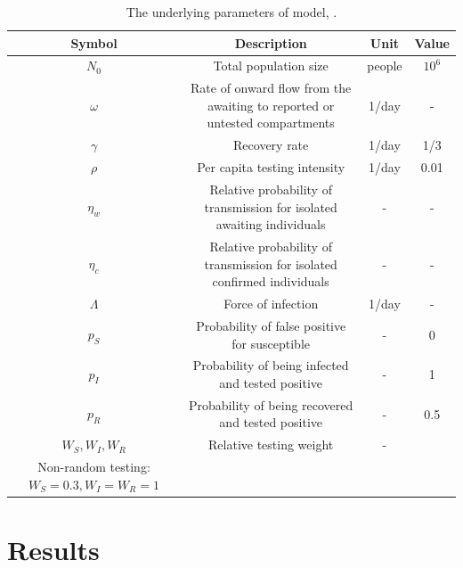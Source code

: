 \documentclass[12pt]{article}
\theoremstyle{definition} %
\begin{document}
\begin{landscape}
\begin{table}[htp]
\centering
{\tiny %
\begin{tabular}{|c|ccc|} \hline
  Symbol & Description & Unit & Value \\ \hline
  $N_0$     & Total population size & people & $10^6$ \\ \hline
  $\omega$  & Rate of onward flow from the awaiting to reported or untested compartments  & 1/day & - \\ \hline
  $\gamma$ & Recovery rate & 1/day & 1/3 \\ \hline
  $\rho$   & Per capita testing intensity & 1/day & 0.01 \\ \hline
  $\eta_w$  & Relative probability of transmission for isolated awaiting individuals & - & - \\ \hline
  $\eta_c$  & Relative probability of transmission for isolated confirmed individuals & - & -  \\ \hline
  $\Lambda$ & Force of infection & 1/day & - \\ \hline
  $p_S$ & Probability of false positive for susceptible& - & 0 \\ \hline
  $p_I$ & Probability of being infected and tested positive & - & 1 \\ \hline
  $p_R$ & Probability of being recovered and tested positive & - & 0.5 \\ \hline
  $W_S, W_I, W_R$ & Relative testing weight & - &
  \begin{minipage}[t]{0.21\columnwidth}%
 Random testing: $W_S=W_I=W_R=1$, \\Non-random testing: $W_S=0.3, W_I=W_R=1$
\end{minipage} \\ \hline

  \end{tabular}
  }%
\caption{\label{tab:params} The underlying parameters of model, .}
\end{table}
\end{landscape}
\restoregeometry
 
\section{Results}
\end{document}
